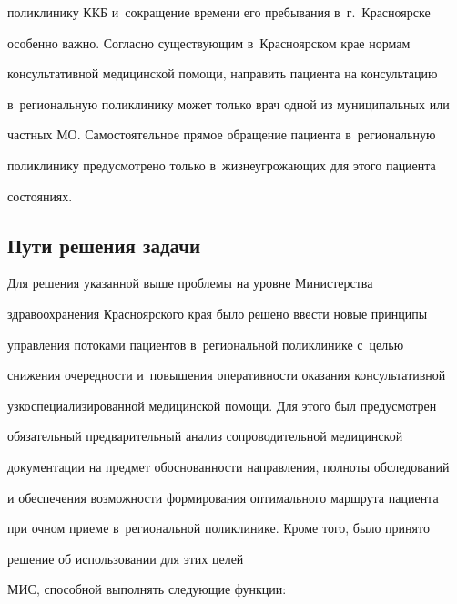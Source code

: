 поликлинику ККБ и~сокращение времени его пребывания в~г.~Красноярске 


особенно важно. Согласно существующим в~Красноярском крае нормам 


консультативной медицинской помощи, направить пациента на консультацию 


в~региональную поликлинику может только врач одной из муниципальных или 


частных МО. Самостоятельное прямое обращение пациента в~региональную 


поликлинику предусмотрено только в~жизнеугрожающих для этого пациента 


состояниях.


  


\subsection{Пути решения задачи}


  


  Для решения указанной выше проблемы на уровне Министерства 


здравоохранения Красноярского края было решено ввести новые принципы 


управления потоками пациентов в~региональной поликлинике с~целью 


снижения очередности и~повышения оперативности оказания консультативной 


узкоспециализированной медицинской помощи. Для этого был предусмотрен 


обязательный предварительный анализ сопроводительной медицинской 


документации на предмет обосно\-ван\-ности направления, полноты обследований 


и обеспечения возможности формирования оптимального маршрута пациента 


при очном приеме в~региональной поликлинике. Кроме того, было принято 


решение об использовании для этих целей 


МИС, способной выполнять следующие функции:


